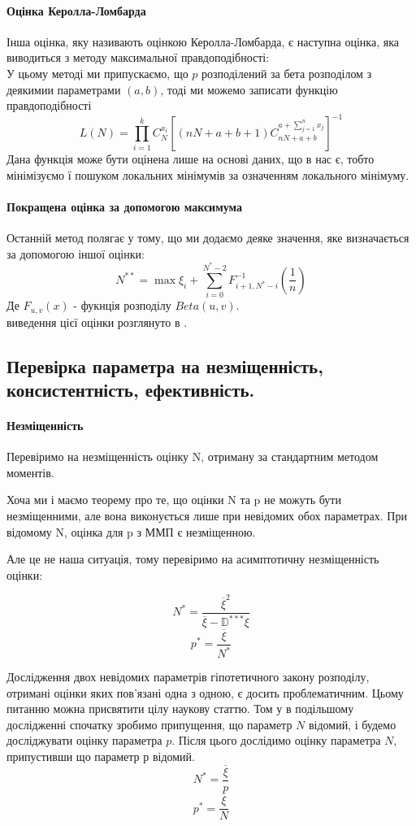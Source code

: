 \documentclass{article}
\begin{document}
\paragraph{Оцінка Керолла-Ломбарда}
Інша оцінка, яку називають оцінкою Керолла-Ломбарда, є наступна оцінка, яка виводиться з методу
максимальної правдоподібності: \\
У цьому методі ми припускаємо, що $p$ розподілений за бета розподілом з деякимии параметрами $(a,
b)$, тоді ми можемо записати функцію правдоподібності
$$
L(N) = \prod_{i=1}^{k} C_N^{x_i} \left[ (nN + a + b + 1) C_{nN + a + b}^{a + \sum_{j=1}^nx_j }
\right]^{-1}
$$
Дана функція може бути оцінена лише на основі даних, що в нас є, тобто мінімізуємо ї пошуком
локальних мінімумів за означенням локального мінімуму.

\paragraph{Покращена оцінка за допомогою максимума}
Останній метод полягає у тому, що ми додаємо деяке значення, яке визначається за допомогою іншої
оцінки:
$$
N^{**} = \max\xi_i + \sum_{i=0}^{N^* - 2}F_{i+1, N^* - i}^{-1} \left(\frac{1}{n}\right)
$$
Де $F_{u, v}(x)$ - фукнція розподілу $Beta(u, v)$. \\
виведення цієї оцінки розглянуто в \cite{1}.

\subsection{Перевірка параметра на незміщенність, консистентність, ефективність.}
\paragraph{Незміщенність}
Перевіримо на незміщенність оцінку N, отриману за стандартним методом моментів.
   
Хоча ми і маємо теорему про те, що оцінки N та p не можуть бути незміщенними, але вона виконується
лише при невідомих обох параметрах. При відомому N, оцінка для p з ММП є незміщенною.

Але це не наша ситуація, тому перевіримо на асимптотичну незміщенність оцінки:

$$
    N^* = \frac{\overline{\xi}^2}{\overline{\xi} - \mathbb{D}^{***}\xi}
$$
$$
    p^* =  \frac{\overline{\xi}}{N^*}  
$$

Дослідження двох невідомих параметрів гіпотетичного закону розподілу, отримані оцінки яких пов'язані
одна з одною, є досить проблематичним. Цьому питанню можна присвятити цілу наукову статтю.
Том у в подільшому дослідженні спочатку зробимо припущення, що параметр $N$ відомий, і будемо
досліджувати оцінку параметра $p$. Після цього дослідимо оцінку параметра $N$, припустивши що
параметр $р$ відомий.
$$
N^* = \frac{\overline\xi}{p}
$$
$$
p^* = \frac{\overline\xi}{N}
$$
\end{document}
